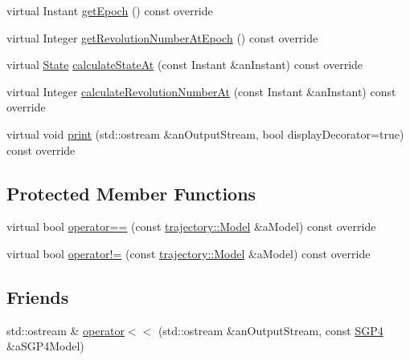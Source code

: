 \begin{DoxyCompactItemize}
\item 
virtual Instant \hyperlink{classostk_1_1astro_1_1trajectory_1_1orbit_1_1models_1_1_s_g_p4_af577ee4ad56452fe510d325a61a9792e}{get\+Epoch} () const override
\item 
virtual Integer \hyperlink{classostk_1_1astro_1_1trajectory_1_1orbit_1_1models_1_1_s_g_p4_a6216f01c1ee37817ca1ae1c7036f942c}{get\+Revolution\+Number\+At\+Epoch} () const override
\item 
virtual \hyperlink{classostk_1_1astro_1_1trajectory_1_1_state}{State} \hyperlink{classostk_1_1astro_1_1trajectory_1_1orbit_1_1models_1_1_s_g_p4_ad88439d9c46a75d3da8c20d2872271e3}{calculate\+State\+At} (const Instant \&an\+Instant) const override
\item 
virtual Integer \hyperlink{classostk_1_1astro_1_1trajectory_1_1orbit_1_1models_1_1_s_g_p4_af14e7851024d96eb20033ca9296dc003}{calculate\+Revolution\+Number\+At} (const Instant \&an\+Instant) const override
\item 
virtual void \hyperlink{classostk_1_1astro_1_1trajectory_1_1orbit_1_1models_1_1_s_g_p4_a12416476201382c3d1e3c620f7be106a}{print} (std\+::ostream \&an\+Output\+Stream, bool display\+Decorator=true) const override
\end{DoxyCompactItemize}
\subsection*{Protected Member Functions}
\begin{DoxyCompactItemize}
\item 
virtual bool \hyperlink{classostk_1_1astro_1_1trajectory_1_1orbit_1_1models_1_1_s_g_p4_ad51d979b8b9b37251b6381cfe9df55ea}{operator==} (const \hyperlink{classostk_1_1astro_1_1trajectory_1_1_model}{trajectory\+::\+Model} \&a\+Model) const override
\item 
virtual bool \hyperlink{classostk_1_1astro_1_1trajectory_1_1orbit_1_1models_1_1_s_g_p4_a87441104e4e1c63356abe0632b56edb6}{operator!=} (const \hyperlink{classostk_1_1astro_1_1trajectory_1_1_model}{trajectory\+::\+Model} \&a\+Model) const override
\end{DoxyCompactItemize}
\subsection*{Friends}
\begin{DoxyCompactItemize}
\item 
std\+::ostream \& \hyperlink{classostk_1_1astro_1_1trajectory_1_1orbit_1_1models_1_1_s_g_p4_a44bd6a41f5d1be384d07b897785529f1}{operator$<$$<$} (std\+::ostream \&an\+Output\+Stream, const \hyperlink{classostk_1_1astro_1_1trajectory_1_1orbit_1_1models_1_1_s_g_p4}{S\+G\+P4} \&a\+S\+G\+P4\+Model)
\end{DoxyCompactItemize}


